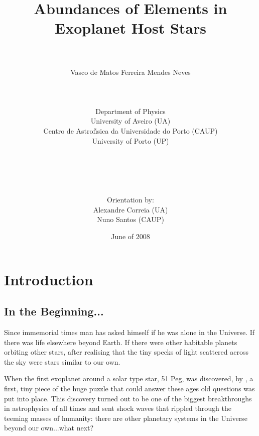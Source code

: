 \documentclass[dvips,12pt,a4paper]{report}
\title{Abundances of Elements in Exoplanet Host Stars}
\author{\\
\\
Vasco de Matos Ferreira Mendes Neves \\ [4mm]
\\
\\
\\
Department of Physics \\
University of Aveiro (UA) \\
Centro de Astrof\'{\i}sica da Universidade do Porto (CAUP) \\
University of Porto (UP)
\\
\\
\\
\\
\\
\\
Orientation by:\\
Alexandre Correia (UA) \\ Nuno Santos (CAUP)}
\date{June of 2008}
\begin{document}
\maketitle
\newpage
{}
\tableofcontents
\newpage
{}


\chapter{Introduction}
\cfoot{ { \thepage} }
\pagestyle{fancy}
\section{In the Beginning...}

Since immemorial times man has asked himself if he was alone in the Universe. If there was life elsewhere beyond Earth. If there were other habitable planets orbiting other stars, after realising that the tiny specks of light scattered across the sky were stars similar to our own.

When the first exoplanet around a solar type star, 51 Peg, was discovered, by \citet{Mayor-1995}, %
a first, tiny piece of the huge puzzle that could answer these ages old questions was put into place. This discovery turned out to be one of the biggest breakthroughs in astrophysics of all times and sent shock waves that rippled through the teeming masses of humanity: there are other planetary systems in the Universe beyond our own...what next?
\end{document}
